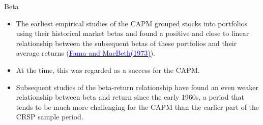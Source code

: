 \documentclass{beamer}
\begin{document}
\begin{frame}{Beta}
	\begin{itemize}
		\item The earliest empirical studies of the CAPM grouped stocks into portfolios using their historical market betas and found a positive and close to linear relationship between the subsequent betas of these portfolios and their average returns (\href{https://www.journals.uchicago.edu/doi/abs/10.1086/260061}{\textcolor{blue}{Fama and MacBeth(1973)}}).
		\item At the time, this was regarded as a success for
		the CAPM.
		\item Subsequent studies of the beta-return relationship have found an
		even weaker relationship between beta and return since the early 1960s, a period that tends to be much more challenging for the CAPM than the earlier part of the CRSP sample period.
	\end{itemize}
\end{frame}
\end{document}
